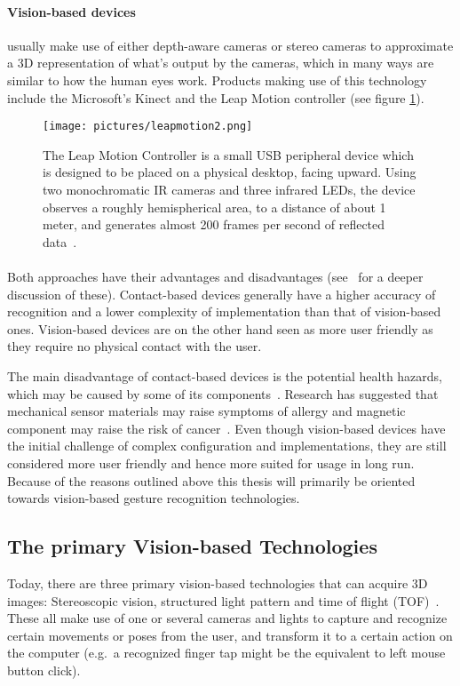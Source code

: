 \paragraph{Vision-based devices} usually make use of either depth-aware cameras or stereo cameras to approximate a 3D representation of what's output by the cameras, 
which in many ways are similar to how the human eyes work. 
Products making use of this technology include the Microsoft's Kinect and the Leap Motion controller (see figure \ref{fig:leapmotion}). 

\begin{figure}%
	\texttt{[image: pictures/leapmotion2.png]}
	\caption[The Leap Motion Controller]{The Leap Motion Controller is a small USB peripheral device which is designed to be placed on a physical desktop, 
	facing upward. Using two monochromatic IR cameras and three infrared LEDs, the device observes a roughly hemispherical area, to a distance of about 1 meter, 
	and generates almost 200 frames per second of reflected data~\citep{LeapMotion2016}.}
	\label{fig:leapmotion}
\end{figure} 

\paragraph{}Both approaches have their advantages and disadvantages (see~\citet{Rautaray2015} for a deeper discussion of these). 
Contact-based devices generally have a higher accuracy of recognition and a lower complexity of implementation than that of vision-based ones. 
Vision-based devices are on the other hand seen as more user friendly as they require no physical contact with the user. 

The main disadvantage of contact-based devices is the potential health hazards, which may be caused by some of its components~\citep{Schultz2003}. 
Research has suggested that mechanical sensor materials may raise symptoms of allergy and magnetic component may raise the risk of cancer~\citep{Nishikawa2003}. 
Even though vision-based devices have the initial challenge of complex configuration and implementations, 
they are still considered more user friendly and hence more suited for usage in long run. Because of the reasons outlined above this thesis will primarily 
be oriented towards vision-based gesture recognition technologies. 

\subsection{The primary Vision-based Technologies}
Today, there are three primary vision-based technologies that can acquire 3D images: Stereoscopic vision, structured light pattern and time of flight (TOF)~\citep{Ko2012}.
These all make use of one or several cameras and lights to capture and recognize certain movements or poses from the user, and transform it to a certain action on the computer (e.g.~a recognized finger tap might be the equivalent to left mouse button click). 

